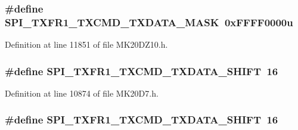 \subsubsection[{\texorpdfstring{S\+P\+I\+\_\+\+T\+X\+F\+R1\+\_\+\+T\+X\+C\+M\+D\+\_\+\+T\+X\+D\+A\+T\+A\+\_\+\+M\+A\+SK}{SPI_TXFR1_TXCMD_TXDATA_MASK}}]{\setlength{\rightskip}{0pt plus 5cm}\#define S\+P\+I\+\_\+\+T\+X\+F\+R1\+\_\+\+T\+X\+C\+M\+D\+\_\+\+T\+X\+D\+A\+T\+A\+\_\+\+M\+A\+SK~0x\+F\+F\+F\+F0000u}\hypertarget{group___s_p_i___register___masks_ga03437d9c36165cd76cc1b649bc61fdcd}{}\label{group___s_p_i___register___masks_ga03437d9c36165cd76cc1b649bc61fdcd}


Definition at line 11851 of file M\+K20\+D\+Z10.\+h.

\subsubsection[{\texorpdfstring{S\+P\+I\+\_\+\+T\+X\+F\+R1\+\_\+\+T\+X\+C\+M\+D\+\_\+\+T\+X\+D\+A\+T\+A\+\_\+\+S\+H\+I\+FT}{SPI_TXFR1_TXCMD_TXDATA_SHIFT}}]{\setlength{\rightskip}{0pt plus 5cm}\#define S\+P\+I\+\_\+\+T\+X\+F\+R1\+\_\+\+T\+X\+C\+M\+D\+\_\+\+T\+X\+D\+A\+T\+A\+\_\+\+S\+H\+I\+FT~16}\hypertarget{group___s_p_i___register___masks_ga0240ff4345642a5bca2308c670c5a980}{}\label{group___s_p_i___register___masks_ga0240ff4345642a5bca2308c670c5a980}


Definition at line 10874 of file M\+K20\+D7.\+h.

\subsubsection[{\texorpdfstring{S\+P\+I\+\_\+\+T\+X\+F\+R1\+\_\+\+T\+X\+C\+M\+D\+\_\+\+T\+X\+D\+A\+T\+A\+\_\+\+S\+H\+I\+FT}{SPI_TXFR1_TXCMD_TXDATA_SHIFT}}]{\setlength{\rightskip}{0pt plus 5cm}\#define S\+P\+I\+\_\+\+T\+X\+F\+R1\+\_\+\+T\+X\+C\+M\+D\+\_\+\+T\+X\+D\+A\+T\+A\+\_\+\+S\+H\+I\+FT~16}\hypertarget{group___s_p_i___register___masks_ga0240ff4345642a5bca2308c670c5a980}{}\label{group___s_p_i___register___masks_ga0240ff4345642a5bca2308c670c5a980}


